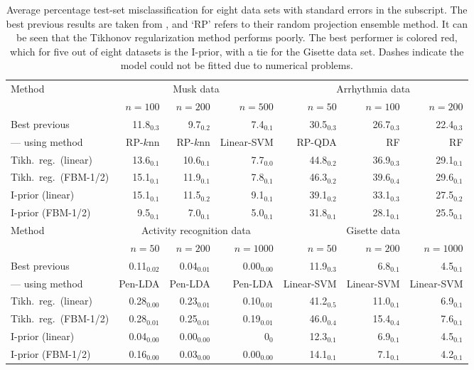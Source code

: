 \documentclass[preprint,12pt,authoryear]{elsarticle}
\begin{document}
\begin{table}
\begin{tabular}{lrrrrrr}
	\hline
	Method & \multicolumn{3}{c}{Musk data} & \multicolumn{3}{c}{Arrhythmia data}  \\
	& $n=100$ & $n=200$ & $n=500$   & $n=50$ & $n=100$ & $n=200$       \\ \hline
	Best previous & 11.8$_{0.3}$ & 9.7$_{0.2}$ & 7.4$_{0.1}$ & \color{red}30.5$_{0.3}$ & \color{red}26.7$_{0.3}$ & \color{red}22.4$_{0.3}$ \\
	--- using method & \scriptsize RP-$k$nn  & \scriptsize RP-$k$nn & \scriptsize Linear-SVM  & \color{red}\scriptsize RP-QDA  & \color{red}\scriptsize RF  & \color{red}\scriptsize RF  \\
	Tikh.\ reg.\ (linear)  & 13.6$_{0.1}$ & 10.6$_{0.1}$ & 7.7$_{0.0}$ & 44.8$_{0.2}$ & 36.9$_{0.3}$ & 29.1$_{0.1}$   \\
	Tikh.\ reg.\ (FBM-1/2) & 15.1$_{0.1}$ & 11.9$_{0.1}$ & 7.8$_{0.1}$ & 46.3$_{0.2}$ & 39.6$_{0.4}$ & 29.6$_{0.1}$   \\
	I-prior (linear) &15.1$_{0.1}$&	11.5$_{0.2}$&	9.1$_{0.1}$	&		39.1$_{0.2}$ & 33.1$_{0.3}$ & 27.5$_{0.2}$ \\	
	I-prior (FBM-1/2) &\color{red}9.5$_{0.1}$& \color{red}7.0$_{0.1}$&	\color{red}5.0$_{0.1}$ &       31.8$_{0.1}$ & 28.1$_{0.1}$ & 25.5$_{0.1}$ \\[2mm]
	
	\hline
	Method & \multicolumn{3}{c}{Activity recognition data} & \multicolumn{3}{c}{Gisette data}  \\
	& $n=50$ & $n=200$ & $n=1000$   & $n=50$ & $n=200$ & $n=1000$       \\ \hline
	Best previous & 0.11$_{0.02}$ & 0.04$_{0.01}$ & 0.00$_{0.00}$ & \color{red}11.9$_{0.3}$ & \color{red}6.8$_{0.1}$ & 4.5$_{0.1}$ \\
	--- using method & \scriptsize Pen-LDA  & \scriptsize Pen-LDA  & \scriptsize Pen-LDA  & \scriptsize Linear-SVM  & \scriptsize Linear-SVM  & \scriptsize Linear-SVM   \\
	Tikh.\ reg.\ (linear) & 0.28$_{0.00}$ & 0.23$_{0.01}$ & 0.10$_{0.01}$ & 41.2$_{0.5}$ & 11.0$_{0.1}$ & 6.9$_{0.1}$  \\
	Tikh.\ reg.\ (FBM-1/2)& 0.28$_{0.01}$ & 0.25$_{0.01}$ & 0.19$_{0.01}$ & 46.0$_{0.4}$ & 15.4$_{0.4}$ & 7.6$_{0.1}$ \\
	I-prior (linear) & \color{red}0.04$_{0.00}$ & \color{red}0.00$_{0.00}$ & \color{red}0$_{0}$       & 12.3$_{0.1}$ & \color{red}6.9$_{0.1}$ & 4.5$_{0.1}$\\
	I-prior (FBM-1/2)& 0.16$_{0.00}$ & 0.03$_{0.00}$ & 0.00$_{0.00}$ & 14.1$_{0.1}$ & 7.1$_{0.1}$ & \color{red}4.2$_{0.1}$  \\
	\hline
\end{tabular}
	\caption{Average percentage test-set misclassification for eight data sets with standard errors in the subscript. The best previous results are taken from \cite{cs17}, and `RP' refers to their random projection ensemble method. It can be seen that the Tikhonov regularization method performs poorly. The best performer is colored red, which for five out of eight datasets is the I-prior, with a tie for the Gisette data set. 
	Dashes indicate the model could not be fitted due to numerical problems.}
	\label{tbl-class}
\end{table}
\end{document}
